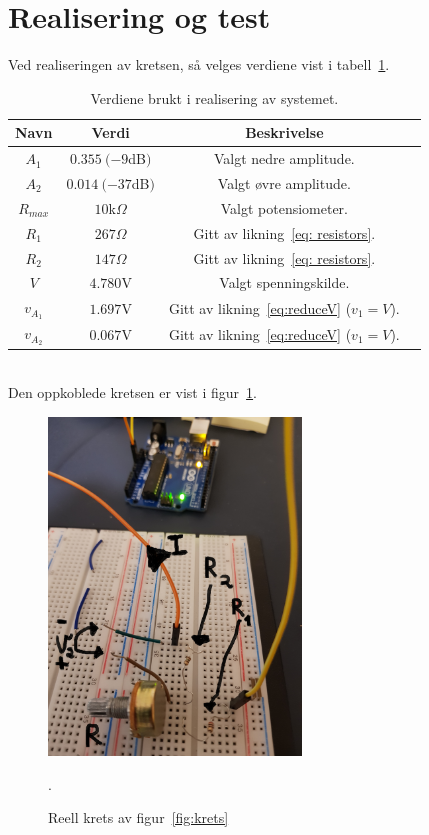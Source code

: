 \documentclass[a4paper,11pt,norsk]{article}
\begin{document}
\section{Realisering og test}
\label{sec:realisering}
Ved realiseringen av kretsen, så velges verdiene vist i tabell~\ref{table:variabler}.
\\
\begin{table}[htbp]
\centering
\begin{tabular}{ |c|c|c|c| } 
\hline
\textbf{Navn} & \textbf{Verdi} & \textbf{Beskrivelse} \\
\hline
$A_1$ & $0.355 \: (-9$dB$)$ & Valgt nedre amplitude.\\
\hline
$A_2$ & $0.014 \: (-37$dB$)$ & Valgt øvre amplitude.\\
\hline
$R_{max}$ & $10$k$\Omega$ &  Valgt potensiometer. \\ 
\hline
$R_1$ & $267\Omega$ & Gitt av likning~\ref{eq: resistors}. \\ 
\hline
$R_2$ & $147\Omega$ & Gitt av likning~\ref{eq: resistors}.\\
\hline
$V$ & $4.780$V & Valgt spenningskilde. \\
\hline
$v_{A_1}$ & $1.697$V & Gitt av likning~\ref{eq:reduceV} ($v_1 = V$). \\
\hline
$v_{A_2}$ & $0.067$V & Gitt av likning~\ref{eq:reduceV} ($v_1 = V$). \\
\hline
\end{tabular}
\caption{Verdiene brukt i realisering av systemet.}
\label{table:variabler}
\end{table}
\\
Den oppkoblede kretsen er vist i figur~\ref{fig:realKrets}.

\begin{figure}[htbp]
    \centering
    \includegraphics[width=0.6\textwidth]{img/realKrets}
    \caption{Reell krets av figur~\ref{fig:krets}}.
    \label{fig:realKrets}
\end{figure}
\end{document}
